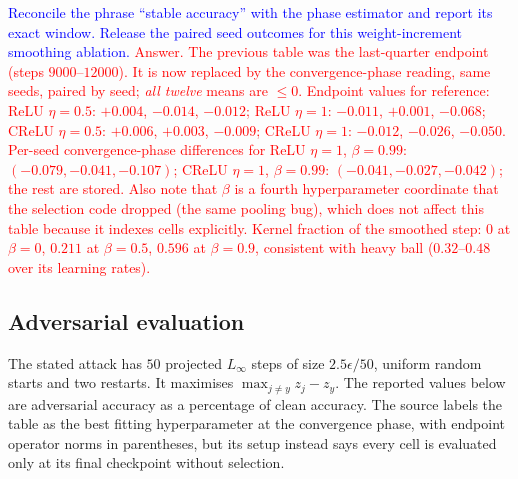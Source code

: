 \documentclass{article}
\newcommand{\zied}[1]{\textcolor{blue}{#1}}
\newcommand{\nat}[1]{\textcolor{red}{#1}}
\theoremstyle{definition}
\theoremstyle{remark}
\begin{document}
\zied{ Reconcile the phrase ``stable accuracy'' with the phase estimator and report its exact window. Release the paired seed outcomes for this weight-increment smoothing ablation.}
\nat{Answer. The previous table was the last-quarter endpoint (steps $9000$--$12000$). It is now replaced by the convergence-phase reading, same seeds, paired by seed; \emph{all twelve} means are $\le0$. Endpoint values for reference: ReLU $\eta=0.5$: $+0.004$, $-0.014$, $-0.012$; ReLU $\eta=1$: $-0.011$, $+0.001$, $-0.068$; CReLU $\eta=0.5$: $+0.006$, $+0.003$, $-0.009$; CReLU $\eta=1$: $-0.012$, $-0.026$, $-0.050$. Per-seed convergence-phase differences for ReLU $\eta=1$, $\beta=0.99$: $(-0.079,-0.041,-0.107)$; CReLU $\eta=1$, $\beta=0.99$: $(-0.041,-0.027,-0.042)$; the rest are stored. Also note that $\beta$ is a fourth hyperparameter coordinate that the selection code dropped (the same pooling bug), which does not affect this table because it indexes cells explicitly. Kernel fraction of the smoothed step: $0$ at $\beta=0$, $0.211$ at $\beta=0.5$, $0.596$ at $\beta=0.9$, consistent with heavy ball ($0.32$--$0.48$ over its learning rates).}

\subsection{Adversarial evaluation}\label{app:e16}

The stated attack has $50$ projected $L_\infty$ steps of size $2.5\epsilon/50$, uniform random starts and two restarts. It maximises $\max_{j\ne y}z_j-z_y$. The reported values below are adversarial accuracy as a percentage of clean accuracy. The source labels the table as the best fitting hyperparameter at the convergence phase, with endpoint operator norms in parentheses, but its setup instead says every cell is evaluated only at its final checkpoint without selection.
\end{document}
